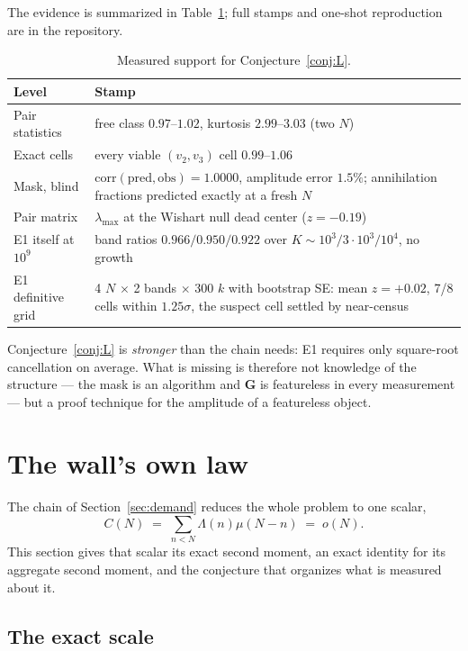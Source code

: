 \documentclass[11pt,a4paper]{article}
\theoremstyle{plain}
\theoremstyle{definition}
\begin{document}
The evidence is summarized in Table~\ref{tab:L}; full stamps and
one-shot reproduction are in the repository.

\begin{table}[t]
\centering\small
\begin{tabular}{p{}p{}}
\hline
Level & Stamp\\
\hline
Pair statistics & free class $0.97$--$1.02$, kurtosis $2.99$--$3.03$
 (two $N$)\\
Exact cells & every viable $(v_2,v_3)$ cell $0.99$--$1.06$\\
Mask, blind & $\mathrm{corr}(\text{pred},\text{obs}) = 1.0000$,
 amplitude error $1.5\%$; annihilation fractions predicted exactly at
 a fresh $N$\\
Pair matrix & $\lambda_{\max}$ at the Wishart null dead center
 ($z = -0.19$)\\
E1 itself at $10^9$ & band ratios $0.966 / 0.950 / 0.922$ over
 $K \sim 10^3/3\cdot10^3/10^4$, no growth\\
E1 definitive grid & 4 $N$ $\times$ 2 bands $\times$ 300 $k$ with
 bootstrap SE: mean $z = +0.02$, 7/8 cells within $1.25\sigma$, the
 suspect cell settled by near-census\\
\hline
\end{tabular}
\caption{Measured support for Conjecture~\ref{conj:L}.}
\label{tab:L}
\end{table}

Conjecture~\ref{conj:L} is \emph{stronger} than the chain needs: E1
requires only square-root cancellation on average. What is missing is
therefore not knowledge of the structure --- the mask is an algorithm
and $\mathbf G$ is featureless in every measurement --- but a proof
technique for the amplitude of a featureless object.

\section{The wall's own law}\label{sec:wall}

The chain of Section~\ref{sec:demand} reduces the whole problem to one
scalar,
\[
  C(N) \;=\; \sum_{n<N}\Lambda(n)\mu(N-n) \;=\; o(N).
\]
This section gives that scalar its exact second moment, an exact
identity for its aggregate second moment, and the conjecture that
organizes what is measured about it.

\subsection{The exact scale}
\end{document}
